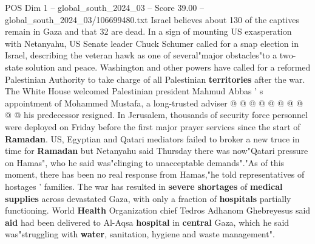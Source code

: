 \begin{textsample}{POS Dim 1 – global\_south\_2024\_03 – Score 39.00 – global\_south\_2024\_03/106699480.txt}
Israel believes about 130 of the captives remain in Gaza and that 32 are dead.
In a sign of mounting US exasperation with Netanyahu, US Senate leader Chuck Schumer called for a snap election in Israel, describing the veteran hawk as one of several"major obstacles"to a two-state solution and peace.
Washington and other powers have called for a reformed Palestinian Authority to take charge of all Palestinian \textbf{territories} after the war.
The White House welcomed Palestinian president Mahmud Abbas ' s appointment of Mohammed Mustafa, a long-trusted adviser @ @ @ @ @ @ @ @ @ @ his predecessor resigned.
In Jerusalem, thousands of security force personnel were deployed on Friday before the first major prayer services since the start of \textbf{Ramadan}.
US, Egyptian and Qatari mediators failed to broker a new truce in time for \textbf{Ramadan} but Netanyahu said Thursday there was now"Qatari pressure on Hamas", who he said was"clinging to unacceptable demands"."As of this moment, there has been no real response from Hamas,"he told representatives of hostages ' families.
The war has resulted in \textbf{severe} \textbf{shortages} of \textbf{medical} \textbf{supplies} across devastated Gaza, with only a fraction of \textbf{hospitals} partially functioning.
World \textbf{Health} Organization chief Tedros Adhanom Ghebreyesus said \textbf{aid} had been delivered to Al-Aqsa \textbf{hospital} in \textbf{central} Gaza, which he said was"struggling with \textbf{water}, sanitation, hygiene and waste management".

\end{textsample}
